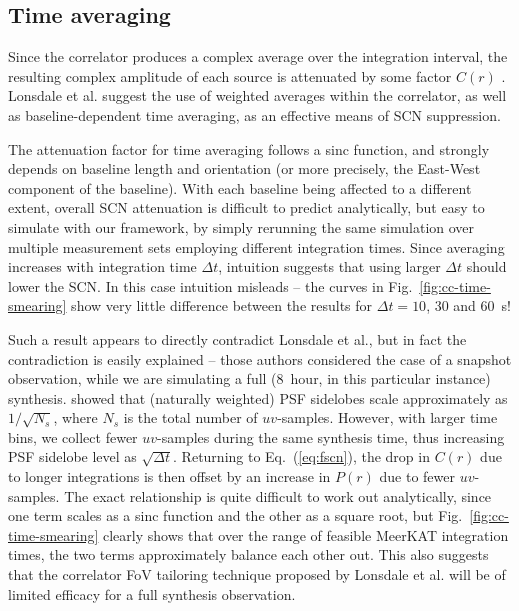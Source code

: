 \documentclass{aa}
\begin{document}
\subsection{Time averaging}
\label{sec:smearing}

Since the correlator produces a complex average over the integration interval, the resulting complex amplitude of each source is attenuated by some factor $C(r)$ \citep[see Eq.~(\ref{eq:fscn}) above, and also Fig.~2 of][]{SKA54-expa,SKA54}. Lonsdale et al. suggest the use of weighted averages within the correlator, as well as baseline-dependent time averaging, as an effective means of SCN suppression.

The attenuation factor for time averaging follows a sinc function, and strongly depends on baseline length and orientation (or more precisely, the East-West component of the baseline). With each baseline being affected to a different extent, overall SCN attenuation is difficult to predict analytically, but easy to simulate with our framework, by simply rerunning the same simulation over multiple measurement sets employing different integration times. Since averaging increases with integration time $\Delta t$, intuition suggests that using larger $\Delta t$ should lower the SCN. In this case intuition misleads -- the curves in Fig.~\ref{fig:cc-time-smearing} show very little difference between the results for $\Delta t=10$, 30 and 60~s!

Such a result appears to directly contradict Lonsdale et al., but in fact the contradiction is easily explained -- those authors considered the case of a snapshot observation, while we are simulating a full (8~hour, in this particular instance) synthesis. \citet{SKA49} showed that (naturally weighted) PSF sidelobes scale approximately as $1/\sqrt{N_s}$, where $N_s$ is the total number of $uv$-samples. However, with larger time bins, we collect fewer $uv$-samples during the same synthesis time, thus increasing PSF sidelobe level as $\sqrt{\Delta t}$. Returning to Eq.~(\ref{eq:fscn}), the drop in $C(r)$ due to longer integrations is then offset by an increase in $P(r)$ due to fewer $uv$-samples. The exact relationship is quite difficult to work out analytically, since one term scales as a sinc function and the other as a square root, but  Fig.~\ref{fig:cc-time-smearing} clearly shows that over the range of feasible MeerKAT integration times, the two terms approximately balance each other out. This also 
suggests that the correlator FoV tailoring technique proposed by Lonsdale et al. will be of limited efficacy for a full synthesis observation.
\end{document}
